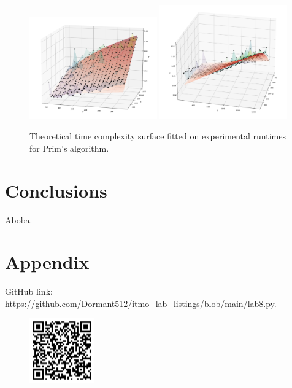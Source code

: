\documentclass[12pt, a4paper]{article}
\begin{document}
\begin{figure}[!h]
\centering
\includegraphics[width=0.49\textwidth]{prim_1.png}
\includegraphics[width=0.49\textwidth]{prim_2.png}
\caption{Theoretical time complexity surface fitted on experimental runtimes for Prim's algorithm.}
\end{figure}

\section*{Conclusions}

Aboba.

\section*{Appendix}

GitHub link: \url{https://github.com/Dormant512/itmo_lab_listings/blob/main/lab8.py}.

\begin{figure}[!h]
\centering
\includegraphics[width=0.25\textwidth]{lab8.png}
\end{figure}
\end{document}
